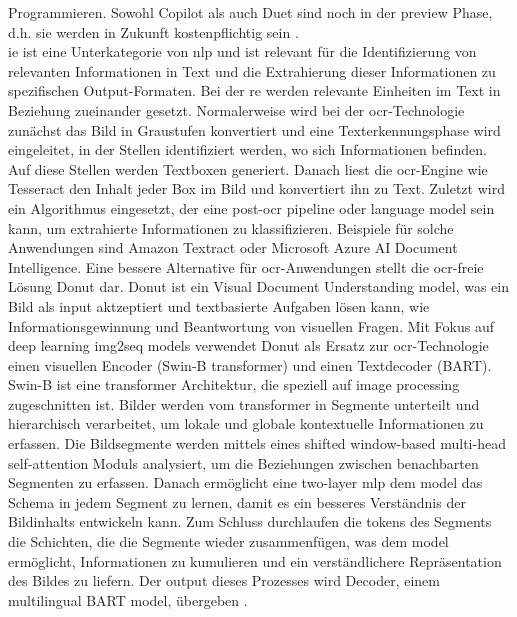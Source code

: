Programmieren. Sowohl Copilot als auch Duet sind noch in der preview Phase, d.h. sie werden in Zukunft kostenpflichtig sein \cite{copilot-duet}. \\

\gls{ie} ist eine Unterkategorie von \gls{nlp} und ist relevant für die Identifizierung von relevanten Informationen in Text und die Extrahierung dieser Informationen zu spezifischen Output-Formaten. Bei der \gls{re} werden relevante Einheiten im Text in Beziehung zueinander gesetzt. Normalerweise wird bei der \gls{ocr}-Technologie zunächst das Bild in Graustufen konvertiert und eine Texterkennungsphase wird eingeleitet, in der Stellen identifiziert werden, wo sich Informationen befinden. Auf diese Stellen werden Textboxen generiert. Danach liest die \gls{ocr}-Engine wie Tesseract den Inhalt jeder Box im Bild und konvertiert ihn zu Text. Zuletzt wird ein Algorithmus eingesetzt, der eine post-\gls{ocr} pipeline oder language model sein kann, um extrahierte Informationen zu klassifizieren. Beispiele für solche Anwendungen sind Amazon Textract oder Microsoft Azure AI Document Intelligence. Eine bessere Alternative für \gls{ocr}-Anwendungen stellt die \gls{ocr}-freie Lösung Donut dar. Donut ist ein Visual Document Understanding model, was ein Bild als input aktzeptiert und textbasierte Aufgaben lösen kann, wie Informationsgewinnung und Beantwortung von visuellen Fragen. Mit Fokus auf deep learning img2seq models verwendet Donut als Ersatz zur \gls{ocr}-Technologie einen visuellen Encoder (Swin-B transformer) und einen Textdecoder (BART). Swin-B ist eine transformer Architektur, die speziell auf image processing zugeschnitten ist. Bilder werden vom transformer in Segmente unterteilt und hierarchisch verarbeitet, um lokale und globale kontextuelle Informationen zu erfassen. Die Bildsegmente werden mittels eines shifted window-based multi-head self-attention Moduls analysiert, um die Beziehungen zwischen benachbarten Segmenten zu erfassen. Danach ermöglicht eine two-layer \gls{mlp} dem model das Schema in jedem Segment zu lernen, damit es ein besseres Verständnis der Bildinhalts entwickeln kann. Zum Schluss durchlaufen die tokens des Segments die Schichten, die die Segmente wieder zusammenfügen, was dem model ermöglicht, Informationen zu kumulieren und ein verständlichere Repräsentation des Bildes zu liefern. Der output dieses Prozesses wird Decoder, einem multilingual BART model, übergeben \cite{transformers-ocr}. \\

